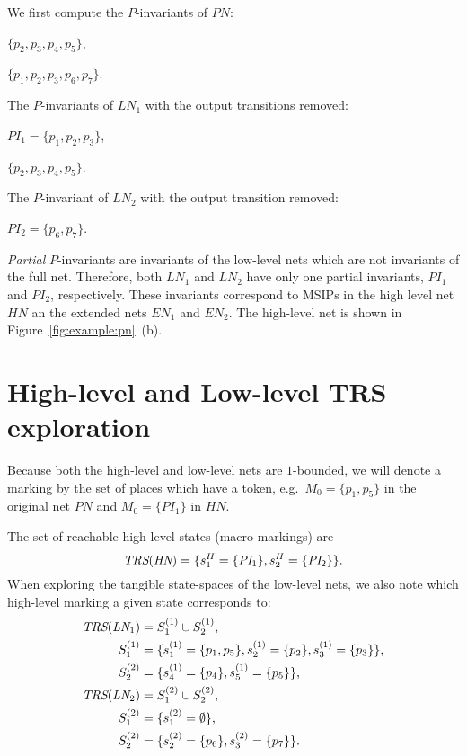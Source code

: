 \documentclass[a4paper,11pt,twoside,openright]{memoir}
\newcommand*{\PN}{\textit{PN}}
\newcommand*{\LN}{\textit{LN}}
\newcommand*{\HN}{\textit{HN}}
\newcommand*{\EN}{\textit{EN}}
\newcommand*{\PI}{\textit{PI}}
\newcommand*{\TRS}{\textit{TRS}}
\theoremstyle{my}
\begin{document}
We first compute the $P$-invariants of $\PN$:
\begin{itemize*}
\item $\{p_2, p_3, p_4, p_5\}$,
\item $\{p_1, p_2, p_3, p_6, p_7\}$.
\end{itemize*}
The $P$-invariants of $\LN_1$ with the output transitions removed:
\begin{itemize*}
\item $\PI_1 = \{p_1, p_2, p_3\}$,
\item $\{p_2, p_3, p_4, p_5\}$.
\end{itemize*}
The $P$-invariant of $\LN_2$ with the output transition removed:
\begin{itemize*}
\item $\PI_2 = \{p_6, p_7\}$.
\end{itemize*}

\emph{Partial} $P$-invariants are invariants of the low-level nets
which are not invariants of the full net. Therefore, both $\LN_1$ and
$\LN_2$ have only one partial invariants, $\PI_1$ and $\PI_2$,
respectively. These invariants correspond to MSIPs in the high level
net $\HN$ an the extended nets $\EN_1$ and $\EN_2$. The high-level net
is shown in Figure~\ref{fig:example:pn}~(b).

\section{High-level and Low-level TRS exploration}

Because both the high-level and low-level nets are $1$-bounded, we
will denote a marking by the set of places which have a token,
e.g.~$M_0 = \{p_1, p_5\}$ in the original net $\PN$ and $M_0 =
\{\PI_1\}$ in $\HN$.

The set of reachable high-level states (macro-markings) are
\begin{equation*}
  \TRS(\HN) = \{s^H_1 = \{\PI_1\}, s^H_2 = \{\PI_2\}\} \text.
\end{equation*}
When exploring the tangible state-spaces of the low-level nets, we
also note which high-level marking a given state corresponds to:
\begin{align*}
  \TRS(\LN_1) &= S^{(1)}_1 \cup S^{(1)}_2 \text, \\
  S^{(1)}_1 &= \{s^{(1)}_{1} = \{p_1, p_5\}, s^{(1)}_{2} = \{p_2\},
              s^{(1)}_{3} = \{p_3\}\} \text, \\
  S^{(2)}_2 &= \{s^{(1)}_{4} = \{p_4\}, s^{(1)}_{5} = \{p_5\}\} \text,
  \\
  \TRS(\LN_2) &= S^{(2)}_1 \cup S^{(2)}_2 \text, \\
  S^{(2)}_1 &= \{s^{(2)}_{1} = \emptyset\} \text, \\
  S^{(2)}_2 &= \{s^{(2)}_{2} = \{p_6\}, s^{(2)}_{3} = \{p_7\}\} \text.
\end{align*}
\end{document}
